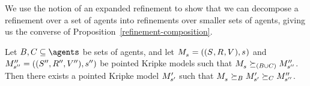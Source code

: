 We use the notion of an expanded refinement to show that we can decompose a refinement over a set of agents into refinements over smaller sets of agents, giving us the converse of Proposition~\ref{refinement-composition}.

\begin{proposition}\label{refinement-decomposition}
Let $\agentsB, \agentsC \subseteq \agents$ be sets of agents, and let $\kPModelAndTuple{\kStateS}$ and $\kPModelAndTuplePP{\kStateSPP}$ be pointed Kripke models such that $\kPModel{\kStateS} \simulates[(\agentsB \cup \agentsC)] \kPModelPP{\kStateSPP}$.
Then there exists a pointed Kripke model ${M^{\prime}_{{s}^{\prime}}}$ such that $\kPModel{\kStateS} \simulatesBs \kPModelP{\kStateSP} \simulatesCs \kPModelPP{\kStateSPP}$.
\end{proposition}

